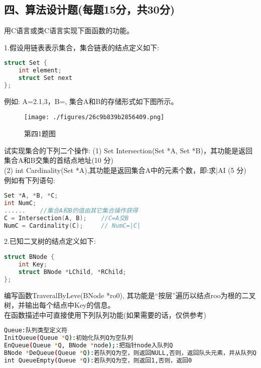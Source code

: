 \subsection{四、算法设计题(每题15分，共30分)}
用C语言或类C语言实现下面函数的功能。

1.假设用链表表示集合，集合链表的结点定义如下:
\begin{lstlisting}[language=cpp]
struct Set {
    int element;
    struct Set next
};
\end{lstlisting}
例如: A={2.1,3}，B={}, 集合A和B的存储形式如下图所示。
\begin{figure}[ht]
\centering
\texttt{[image: ./figures/26c9b839b2856409.png]}
\caption{第四1题图} \label{fig_SYDS11_8}
\end{figure}
试实现集合的下列二个操作:
(1) Set Intersection(Set *A, Set *B)，其功能是返回集合A和B交集的首结点地址(10 分) \\
(2) int Cardinality(Set *A),其功能是返回集合A中的元素个数，即:求|AI (5 分) \\
例如有下列语句:
\begin{lstlisting}[language=cpp]
Set *A, *B, *C;
int NumC;
......    //集合A和B的值由其它集合操作获得
C = Intersection(A, B);    //C=A交B
NumC = Cardinality(C);     // NumC=|C|
\end{lstlisting}

2.已知二叉树的结点定义如下:
\begin{lstlisting}[language=cpp]
struct BNode {
    int Key;
    struct BNode *LChild, *RChild;
};
\end{lstlisting}
编写函数TraveralByLeve(BNode *ro0), 其功能是“按层”遍历以结点roo为根的二叉树，并输出每个结点中Key的信息。 \\
在函数描述中可直接使用下列队列功能(如果需要的话，仅供参考)
\begin{lstlisting}[language=bash]
Queue:队列类型定义符
InitQueue(Queue *Q):初始化队列Q为空队列
EnQueue(Queue *Q, BNode *node);:把指针node入队列Q
BNode *DeQueue(Queue *Q):若队列Q为空，则返回NULL,否则，返回队头元素，并从队列Q中删除该队头元索
int QueueEmpty(Queue *Q):若队列Q为空，则返回1,否则，返回0
\end{lstlisting}
